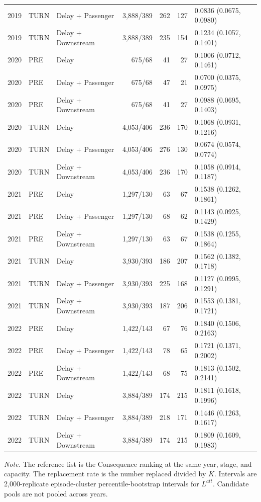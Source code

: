 \documentclass[10pt,a4paper]{article}
\numberwithin{equation}{section}
\begin{document}
\begin{longtable}{r l l r r r l}
2019 & TURN & Delay + Passenger & 3,888/389 & 262 & 127 & 0.0836 (0.0675, 0.0980) \\
2019 & TURN & Delay + Downstream & 3,888/389 & 235 & 154 & 0.1234 (0.1057, 0.1401) \\
2020 & PRE & Delay & 675/68 & 41 & 27 & 0.1006 (0.0712, 0.1461) \\
2020 & PRE & Delay + Passenger & 675/68 & 47 & 21 & 0.0700 (0.0375, 0.0975) \\
2020 & PRE & Delay + Downstream & 675/68 & 41 & 27 & 0.0988 (0.0695, 0.1403) \\
2020 & TURN & Delay & 4,053/406 & 236 & 170 & 0.1068 (0.0931, 0.1216) \\
2020 & TURN & Delay + Passenger & 4,053/406 & 276 & 130 & 0.0674 (0.0574, 0.0774) \\
2020 & TURN & Delay + Downstream & 4,053/406 & 236 & 170 & 0.1058 (0.0914, 0.1187) \\
2021 & PRE & Delay & 1,297/130 & 63 & 67 & 0.1538 (0.1262, 0.1861) \\
2021 & PRE & Delay + Passenger & 1,297/130 & 68 & 62 & 0.1143 (0.0925, 0.1429) \\
2021 & PRE & Delay + Downstream & 1,297/130 & 63 & 67 & 0.1538 (0.1255, 0.1864) \\
2021 & TURN & Delay & 3,930/393 & 186 & 207 & 0.1562 (0.1382, 0.1718) \\
2021 & TURN & Delay + Passenger & 3,930/393 & 225 & 168 & 0.1127 (0.0995, 0.1291) \\
2021 & TURN & Delay + Downstream & 3,930/393 & 187 & 206 & 0.1553 (0.1381, 0.1721) \\
2022 & PRE & Delay & 1,422/143 & 67 & 76 & 0.1840 (0.1506, 0.2163) \\
2022 & PRE & Delay + Passenger & 1,422/143 & 78 & 65 & 0.1721 (0.1371, 0.2002) \\
2022 & PRE & Delay + Downstream & 1,422/143 & 68 & 75 & 0.1813 (0.1502, 0.2141) \\
2022 & TURN & Delay & 3,884/389 & 174 & 215 & 0.1811 (0.1618, 0.1996) \\
2022 & TURN & Delay + Passenger & 3,884/389 & 218 & 171 & 0.1446 (0.1263, 0.1617) \\
2022 & TURN & Delay + Downstream & 3,884/389 & 174 & 215 & 0.1809 (0.1609, 0.1983) \\
\end{longtable}
\normalsize
\noindent\textit{Note.} The reference list is the Consequence ranking at the same year, stage, and capacity. The replacement rate is the number replaced divided by $K$. Intervals are 2,000-replicate episode-cluster percentile-bootstrap intervals for $L^{att}$. Candidate pools are not pooled across years.
\end{document}
